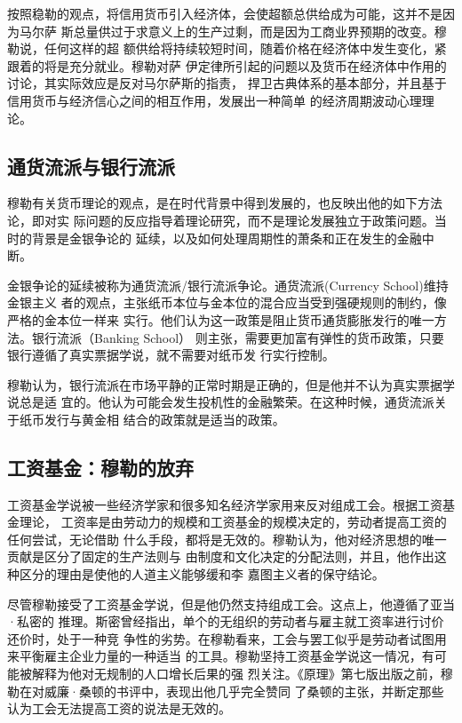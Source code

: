 按照稳勒的观点，将信用货币引入经济体，会使超额总供给成为可能，这并不是因为马尔萨
斯总量供过于求意义上的生产过剩，而是因为工商业界预期的改变。穆勒说，任何这样的超
额供给将持续较短时间，随着价格在经济体中发生变化，紧跟着的将是充分就业。穆勒对萨
伊定律所引起的问题以及货币在经济体中作用的讨论，其实际效应是反对马尔萨斯的指责，
捍卫古典体系的基本部分，并且基于信用货币与经济信心之间的相互作用，发展出一种简单
的经济周期波动心理理论。

\subsection{通货流派与银行流派}

穆勒有关货币理论的观点，是在时代背景中得到发展的，也反映出他的如下方法论，即对实
际问题的反应指导着理论研究，而不是理论发展独立于政策问题。当时的背景是金银争论的
延续，以及如何处理周期性的萧条和正在发生的金融中断。

金银争论的延续被称为通货流派/银行流派争论。通货流派(Currency School)维持金银主义
者的观点，主张纸币本位与金本位的混合应当受到强硬规则的制约，像严格的金本位一样来
实行。他们认为这一政策是阻止货币通货膨胀发行的唯一方法。银行流派（Banking School）
则主张，需要更加富有弹性的货币政策，只要银行遵循了真实票据学说，就不需要对纸币发
行实行控制。

穆勒认为，银行流派在市场平静的正常时期是正确的，但是他并不认为真实票据学说总是适
宜的。他认为可能会发生投机性的金融繁荣。在这种时候，通货流派关于纸币发行与黄金相
结合的政策就是适当的政策。

\subsection{工资基金：穆勒的放弃}

工资基金学说被一些经济学家和很多知名经济学家用来反对组成工会。根据工资基金理论，
工资率是由劳动力的规模和工资基金的规模决定的，劳动者提高工资的任何尝试，无论借助
什么手段，都将是无效的。穆勒认为，他对经济思想的唯一贡献是区分了固定的生产法则与
由制度和文化决定的分配法则，并且，他作出这种区分的理由是使他的人道主义能够缓和李
嘉图主义者的保守结论。

尽管穆勒接受了工资基金学说，但是他仍然支持组成工会。这点上，他遵循了亚当·私密的
推理。斯密曾经指出，单个的无组织的劳动者与雇主就工资率进行讨价还价时，处于一种竞
争性的劣势。在穆勒看来，工会与罢工似乎是劳动者试图用来平衡雇主企业力量的一种适当
的工具。穆勒坚持工资基金学说这一情况，有可能被解释为他对无规制的人口增长后果的强
烈关注。《原理》第七版出版之前，穆勒在对威廉·桑顿的书评中，表现出他几乎完全赞同
了桑顿的主张，并断定那些认为工会无法提高工资的说法是无效的。

